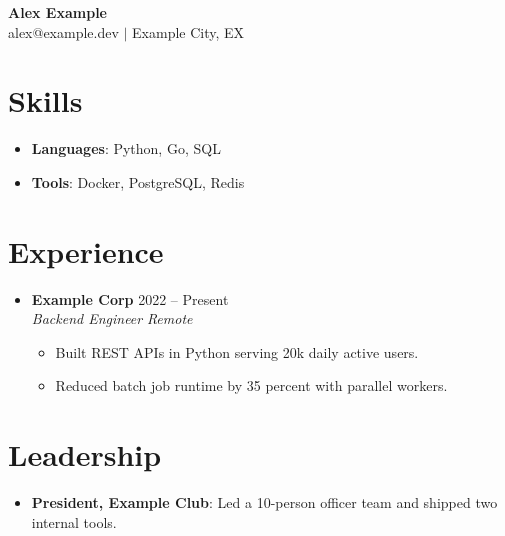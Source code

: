 \documentclass[letterpaper,10pt]{article}
\newcommand{\resumeItem}[2]{
  \item\small{
    \textbf{#1}{: #2 \vspace{-2pt}}
  }
}
\newcommand{\resumeItemWithoutTitle}[1]{
  \item\small{
    {#1 \vspace{-1pt}}
  }
}
\newcommand{\resumeSubItem}[2]{\resumeItem{#1}{#2}\vspace{-4pt}}
\newcommand{\resumeSubheading}[4]{%
  \item
  \textbf{#1} \hfill #2 \\
  \textit{#3} \hfill \textit{#4}%
}
\newcommand{\resumeSubHeadingListStart}{\begin{itemize}[label={}, leftmargin=*]}
\newcommand{\resumeSubHeadingListEnd}{\end{itemize}}
\newcommand{\resumeItemListStart}{\begin{itemize}}
\newcommand{\resumeItemListEnd}{\end{itemize}\vspace{-5pt}}
\begin{document}
\begin{center}
  {\LARGE\bfseries Alex Example}\\[2pt]
  \small alex@example.dev $|$ Example City, EX
\end{center}

\section{Skills}
\resumeSubHeadingListStart
  \resumeSubItem{Languages}{Python, Go, SQL}
  \resumeSubItem{Tools}{Docker, PostgreSQL, Redis}
\resumeSubHeadingListEnd

\section{Experience}
\resumeSubHeadingListStart
  \resumeSubheading{Example Corp}{2022 -- Present}{Backend Engineer}{Remote}
  \resumeItemListStart
    \resumeItemWithoutTitle{}{Built REST APIs in Python serving 20k daily active users.}
    \resumeItemWithoutTitle{}{Reduced batch job runtime by 35 percent with parallel workers.}
  \resumeItemListEnd
\resumeSubHeadingListEnd

\section{Leadership}
\resumeSubHeadingListStart
  \resumeSubItem{President, Example Club}{Led a 10-person officer team and shipped two internal tools.}
\resumeSubHeadingListEnd
\end{document}
